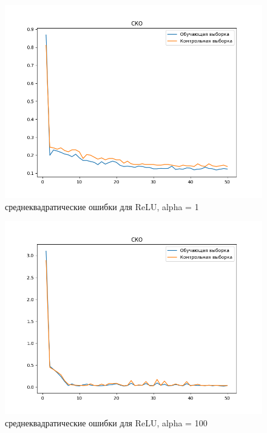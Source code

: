 \documentclass[12pt]{report}
\begin{document}
\begin{figure}[h!]
  \centering
  \includegraphics[width = \linewidth / 2]{std_relu_1.png}
  \caption{среднеквадратические ошибки для ReLU, alpha = 1}
  \label{fig:relu_1_std}
\end{figure}
\newpage
\begin{figure}[h!]
  \centering
  \includegraphics[width = \linewidth / 2]{std_relu_100.png}
  \caption{среднеквадратические ошибки для ReLU, alpha = 100}
  \label{fig:relu_100_std}
\end{figure}
\end{document}
